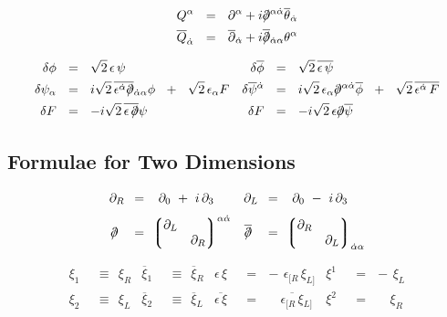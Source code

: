 \documentclass[14pt]{article}
\newcommand{\p}{\partial}
\newcommand{\ov}{\overline}
\newcommand{\lgr}{\left\lgroup}
\newcommand{\rgr}{\right\rgroup}
\def\slashed#1{\setbox0=\hbox{$#1$}             %
   \dimen0=\wd0                                 %
   \setbox1=\hbox{/} \dimen1=\wd1               %
   \ifdim\dimen0>\dimen1                        %
      \rlap{\hbox to \dimen0{\hfil/\hfil}}      %
      #1                                        %
   \else                                        %
      \rlap{\hbox to \dimen1{\hfil$#1$\hfil}}   %
      /                                         %
   \fi}                                         %
\begin{document}
\begin{align*}
   Q^\alpha & ~~=~~  \partial^\alpha +
            i \slashed{\partial}^{\alpha\dot{\alpha}}
	    \overline{\theta}_{\dot{\alpha}}   \\
   \overline{Q}_{\dot{\alpha}} & ~~=~~ \overline{\partial}_{\dot{\alpha}} +
            i \ov{\slashed{\partial}}{}_{\dot{\alpha}\alpha}\theta^\alpha 
\end{align*}

\begin{align*}
	\delta\phi & ~~=~~ \sqrt{2}\, \epsilon\, \psi     &  
		\delta \ov{\phi} & ~~=~~ \sqrt{2}\, \ov{\epsilon\, \psi}\\
	\delta\psi_\alpha & ~~=~~ i\sqrt{2}\, 
			\ov{\epsilon^{\dot{\alpha}} \slashed{\p}}{}_{\dot{\alpha}\alpha} \phi 
			~~+~~ \sqrt{2}\, \epsilon_\alpha F 
&
		\delta \ov{\psi}{}^{\dot{\alpha}} & ~~=~~ 
			i\sqrt{2}\, \epsilon_\alpha \slashed{\p}^{\alpha\dot{\alpha}} \ov{\phi} 
			~~+~~ \sqrt{2}\, \ov{\epsilon^{\dot{\alpha}}\, F} \\
	\delta F & ~~=~~ -i \sqrt{2}\, \ov{\epsilon\, \slashed{\p}} \psi  &
		\delta F & ~~=~~ -i \sqrt{2}\, \epsilon\slashed{\p} \ov{\psi}
\end{align*}


\pagebreak
\begin{center}
\section*{Formulae for Two Dimensions}
\end{center}

\begin{align*}
	\p_R \!\!\! &  ~~~=~ ~\, \p_0 ~+~ i\, \p_3 
	&
	\p_L \!\!\! &  ~~~=~ ~\, \p_0 ~-~ i\, \p_3 
	\\[1mm]
	\slashed\p & ~~~=~ \lgr \begin{matrix}  \p_L  &       \\
						      & \p_R 
			   \end{matrix} \rgr^{\alpha\dot\alpha}
	&
	\ov{\slashed\p} & ~~~=~ \lgr \begin{matrix}  \p_R  &       \\
                                                           & \p_L				
				\end{matrix} \rgr_{\dot\alpha\alpha}
\end{align*}

\begin{align*}
	\xi_1 & ~~\equiv~~ \xi_R  
	&
	\ov\xi{}_1 & ~~\equiv~~ \ov\xi{}_R
	&
	\epsilon\,\xi & ~~=~~ -\, \epsilon_{[R}\, \xi_{L]}
	&
	\xi^1 & ~~=~~ -\, \xi_L
	\\[2mm]
	\xi_2 & ~~\equiv~~ \xi_L
	&
	\ov\xi{}_2 & ~~\equiv~~ \ov\xi{}_L
	&
	\ov{\epsilon\, \xi} & ~~=~~ \phantom{-\,\ } 
				\ov{\epsilon_{[R}\, \xi}{}_{L]}
	&
	\xi^2 & ~~=~~ \phantom{-\,\ }
		      \xi_R
\end{align*}
\end{document}
